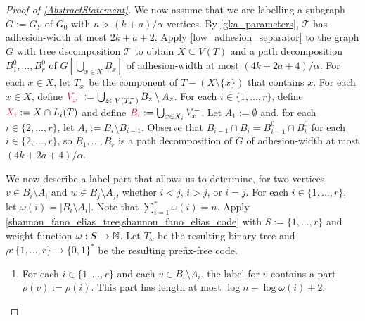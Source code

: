 \documentclass{patmorin}
\makeatletter
\newcommand{\defin}[1]{\emph{\textcolor{brightmaroon}{#1}}}
\def\mathcolor#1#{\@mathcolor{#1}}
\def\@mathcolor#1#2#3{%
  \protect\leavevmode
  \begingroup
    \color#1{#2}#3%
  \endgroup
}
\newcommand{\mathdefin}[1]{\mathcolor{brightmaroon}{#1}}
\makeatother
\begin{document}
\begin{proof}[Proof of \cref{AbstractStatement}]

    We now assume that we are labelling a subgraph $G:=G_Y$ of $G_0$ with $n> (k+a)/\alpha$ vertices.    By \cref{gka_parameters}, $\mathcal{T}$ has adhesion-width at most $2k+a+2$.  Apply \cref{low_adhesion_separator} to the graph $G$ with tree decomposition $\mathcal{T}$ to obtain $X\subseteq V(T)$ and a path decomposition $B^0_1,\ldots,B^0_r$  of $G[\bigcup_{x\in X} B_x]$ of adhesion-width at most $(4k+2a+4)/\alpha$.  For each $x\in X$, let \defin{$T^-_x$} be the component of $T-(X\setminus\{x\})$ that contains $x$. For each $x\in X$, define $\mathdefin{V^-_x}:=\bigcup_{z\in V(T^-_x)}B_z\setminus A_z$.
    For each $i\in\{1,\ldots,r\}$, define $\mathdefin{X_i}:=X\cap L_i(T)$ and define $\mathdefin{B_i}:=\bigcup_{x\in X_i}V^-_x$. Let $A_1:=\emptyset$ and, for each $i\in\{2,\ldots,r\}$, let $A_i:=B_i\setminus B_{i-1}$.
    Observe that $B_{i-1}\cap B_i=B^0_{i-1}\cap B^0_{i}$ for each $i\in\{2,\ldots,r\}$, so $B_1,\ldots,B_r$ is a path decomposition of $G$ of adhesion-width at most $(4k+2a+4)/\alpha$.

    We now describe a label part that allows us to determine, for two vertices $v\in B_i\setminus A_i$ and $w\in B_j\setminus A_j$, whether $i<j$, $i>j$, or $i=j$.
    For each $i\in\{1,\ldots,r\}$, let $\omega(i)=|B_i\setminus A_i|$.  Note that $\sum_{i=1}^r\omega(i) = n$.  Apply \cref{shannon_fano_elias_tree,shannon_fano_elias_code} with $S:=\{1,\ldots,r\}$ and weight function $\omega:S\to\mathbb{N}$. Let $T_\omega$ be the resulting binary tree and $\rho:\{1,\ldots,r\}\to\{0,1\}^*$ be the resulting prefix-free code.

    \begin{enumerate}[nosep,nolistsep,label=(P\arabic*)]
      \item\label{rho_part} For each $i\in\{1,\ldots,r\}$ and each $v\in B_i\setminus A_i$, the label for $v$ contains a part $\rho(v):=\rho(i)$. This part has length at most $\log n-\log\omega(i) + 2$.
    \end{enumerate}


\end{proof}
\end{document}
